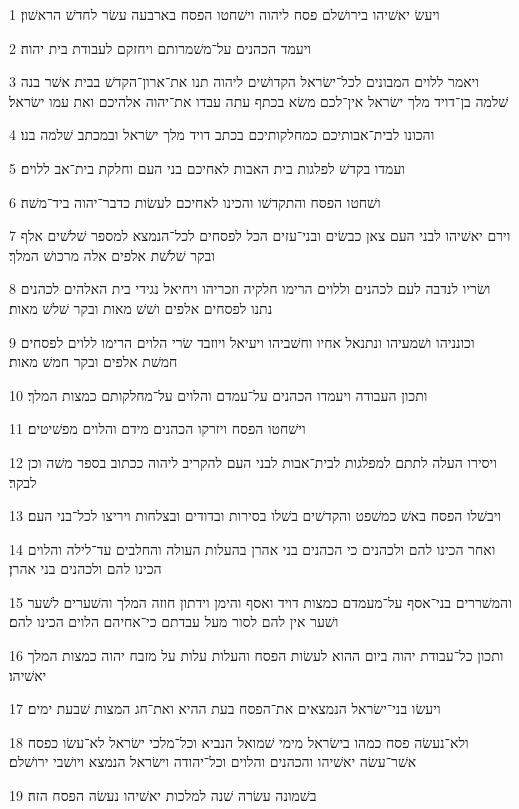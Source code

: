 \par 1 ויעשׂ יאשׁיהו בירושׁלם פסח ליהוה וישׁחטו הפסח בארבעה עשׂר לחדשׁ הראשׁון׃
\par 2 ויעמד הכהנים על־משׁמרותם ויחזקם לעבודת בית יהוה׃
\par 3 ויאמר ללוים המבונים לכל־ישׂראל הקדושׁים ליהוה תנו את־ארון־הקדשׁ בבית אשׁר בנה שׁלמה בן־דויד מלך ישׂראל אין־לכם משׂא בכתף עתה עבדו את־יהוה אלהיכם ואת עמו ישׂראל׃
\par 4 והכונו לבית־אבותיכם כמחלקותיכם בכתב דויד מלך ישׂראל ובמכתב שׁלמה בנו׃
\par 5 ועמדו בקדשׁ לפלגות בית האבות לאחיכם בני העם וחלקת בית־אב ללוים׃
\par 6 ושׁחטו הפסח והתקדשׁו והכינו לאחיכם לעשׂות כדבר־יהוה ביד־משׁה׃
\par 7 וירם יאשׁיהו לבני העם צאן כבשׂים ובני־עזים הכל לפסחים לכל־הנמצא למספר שׁלשׁים אלף ובקר שׁלשׁת אלפים אלה מרכושׁ המלך׃
\par 8 ושׂריו לנדבה לעם לכהנים וללוים הרימו חלקיה וזכריהו ויחיאל נגידי בית האלהים לכהנים נתנו לפסחים אלפים ושׁשׁ מאות ובקר שׁלשׁ מאות׃
\par 9 וכונניהו ושׁמעיהו ונתנאל אחיו וחשׁביהו ויעיאל ויוזבד שׂרי הלוים הרימו ללוים לפסחים חמשׁת אלפים ובקר חמשׁ מאות׃
\par 10 ותכון העבודה ויעמדו הכהנים על־עמדם והלוים על־מחלקותם כמצות המלך׃
\par 11 וישׁחטו הפסח ויזרקו הכהנים מידם והלוים מפשׁיטים׃
\par 12 ויסירו העלה לתתם למפלגות לבית־אבות לבני העם להקריב ליהוה ככתוב בספר משׁה וכן לבקר׃
\par 13 ויבשׁלו הפסח באשׁ כמשׁפט והקדשׁים בשׁלו בסירות ובדודים ובצלחות ויריצו לכל־בני העם׃
\par 14 ואחר הכינו להם ולכהנים כי הכהנים בני אהרן בהעלות העולה והחלבים עד־לילה והלוים הכינו להם ולכהנים בני אהרן׃
\par 15 והמשׁררים בני־אסף על־מעמדם כמצות דויד ואסף והימן וידתון חוזה המלך והשׁערים לשׁער ושׁער אין להם לסור מעל עבדתם כי־אחיהם הלוים הכינו להם׃
\par 16 ותכון כל־עבודת יהוה ביום ההוא לעשׂות הפסח והעלות עלות על מזבח יהוה כמצות המלך יאשׁיהו׃
\par 17 ויעשׂו בני־ישׂראל הנמצאים את־הפסח בעת ההיא ואת־חג המצות שׁבעת ימים׃
\par 18 ולא־נעשׂה פסח כמהו בישׂראל מימי שׁמואל הנביא וכל־מלכי ישׂראל לא־עשׂו כפסח אשׁר־עשׂה יאשׁיהו והכהנים והלוים וכל־יהודה וישׂראל הנמצא ויושׁבי ירושׁלם׃
\par 19 בשׁמונה עשׂרה שׁנה למלכות יאשׁיהו נעשׂה הפסח הזה׃
